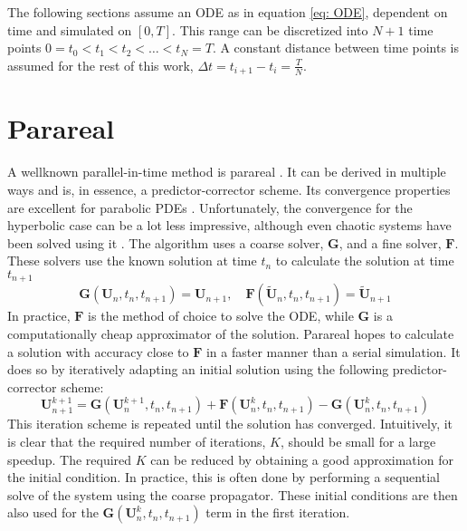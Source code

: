 The following sections assume an ODE as in equation \ref{eq: ODE}, dependent on time and simulated on $[0, T]$.
This range can be discretized into $N + 1$ time points $0 = t_0 < t_1 < t_2 < \hdots < t_{N} = T$. A constant distance between time points is assumed for the rest of this work, $\Delta t = t_{i+1} - t_i = \frac{T}{N}$.

\section{Parareal}
\label{sec: parareal}
A wellknown parallel-in-time method is parareal \cite{lions_resolution_2001,gander_analysis_2014,d_samaddar_parallelization_2010}. It can be derived in multiple ways and is, in essence, a predictor-corrector scheme. Its convergence properties are excellent for parabolic PDEs \cite{gander_analysis_2007}. Unfortunately, the convergence for the hyperbolic case can be a lot less impressive, although even chaotic systems have been solved using it \cite{d_samaddar_parallelization_2010}. The algorithm uses a coarse solver, $\textbf{G}$, and a fine solver, $\textbf{F}$. These solvers use the known solution at time $t_n$ to calculate the solution at time $t_{n+1}$ 
\[\textbf{G}(\textbf{U}_n, t_n, t_{n+1}) = \textbf{U}_{n+1}, \quad
\textbf{F}(\tilde{\textbf{U}}_n, t_n, t_{n+1}) = \tilde{\textbf{U}}_{n+1}
\]
In practice, $\textbf{F}$ is the method of choice to solve the ODE, while $\textbf{G}$ is a computationally cheap approximator of the solution. Parareal hopes to calculate a solution with accuracy close to $\textbf{F}$ in a faster manner than a serial simulation. It does so by iteratively adapting an initial solution using the following predictor-corrector scheme:
\begin{equation}
\textbf{U}_{n+1}^{k+1} = \textbf{G}(\textbf{U}_n^{k+1}, t_n, t_{n+1}) + \textbf{F}(\textbf{U}_n^k, t_n, t_{n+1}) - \textbf{G}(\textbf{U}_n^k, t_n, t_{n+1})
\end{equation}
This iteration scheme is repeated until the solution has converged. 
Intuitively, it is clear that the required number of iterations, $K$, should be small for a large speedup. The required $K$ can be reduced by obtaining a good approximation for the initial condition. In practice, this is often done by performing a sequential solve of the system using the coarse propagator. These initial conditions are then also used for the $\textbf{G}(\textbf{U}_n^k, t_n, t_{n+1})$ term in the first iteration. 

